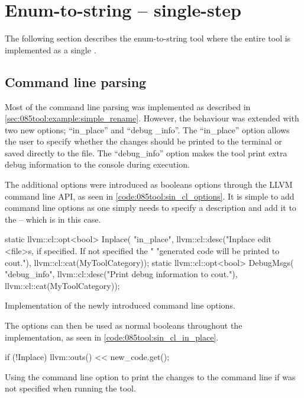 \section{Enum-to-string -- single-step}
The following section describes the enum-to-string tool where the entire tool is implemented as a single .

\subsection{Command line parsing}
Most of the command line parsing was implemented as described in \cref{sec:085tool:example:simple_rename}. However, the behaviour was extended with two new options; ``in\_place'' and ``debug \_info''.
The ``in\_place'' option allows the user to specify whether the changes should be printed to the terminal or saved directly to the file.
The ``debug\_info'' option makes the tool print extra debug information to the console during execution.

The additional options were introduced as booleans options through the LLVM command line API, as seen in \cref{code:085tool:sin_cl_options}. It is simple to add command line options as one simply needs to specify a description and add it to the  -- which is  in this case.

\begin{listing}[H]
    \begin{cppcode}
static llvm::cl::opt<bool> Inplace(
    "in_place",
    llvm::cl::desc("Inplace edit <file>s, if specified. If not specified the "
                   "generated code will be printed to cout."),
    llvm::cl::cat(MyToolCategory));
static llvm::cl::opt<bool> DebugMsgs(
    "debug_info", llvm::cl::desc("Print debug information to cout."),
    llvm::cl::cat(MyToolCategory));
    \end{cppcode}
    \caption{Implementation of the newly introduced command line options.}
    \label{code:085tool:sin_cl_options}
\end{listing}

The options can then be used as normal booleans throughout the implementation, as seen in \cref{code:085tool:sin_cl_in_place}.

\begin{listing}[H]
    \begin{cppcode}
if (!Inplace) {
    llvm::outs() << new_code.get();
}
    \end{cppcode}
    \caption{Using the  command line option to print the changes to the command line if  was not specified when running the tool.}
    \label{code:085tool:sin_cl_in_place}
\end{listing}

